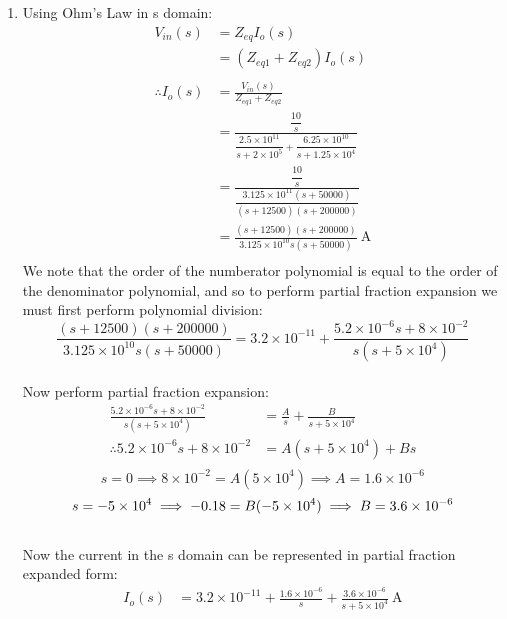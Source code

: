 \begin{enumerate}
	\item{
		Using Ohm's Law in s domain:
		\begin{align*}
			V_{in}(s) &= Z_{eq} I_o(s) \\
			&= (Z_{eq1} + Z_{eq2}) I_o(s) \\
			\\
			\therefore I_o(s) &= \frac{V_{in}(s)}{Z_{eq1} + Z_{eq2}} \\
			&= \frac{\dfrac{10}{s}} 
			{\dfrac{2.5 \times 10^{11}}
			{s + 2 \times 10^5} + \dfrac{6.25 \times 10^{10}}{s + 1.25 \times 10^4}} \\
			&= \frac{\dfrac{10}{s}} 
			{\dfrac{3.125 \times 10^{11} (s + 50000)}{(s+12500)(s+200000)}} \\
			&= \frac{(s+12500)(s+200000)}{3.125 \times 10^{10} s (s + 50000)} \ \mathrm{A} \\
		\end{align*}
		We note that the order of the numberator polynomial is equal to the order of the denominator polynomial, and so to perform partial fraction expansion we must first perform polynomial division:
		\\
		\begin{equation*}
			\frac{(s+12500)(s+200000)}{3.125 \times 10^{10} s (s + 50000)} = 3.2\times10^{-11} + \frac{5.2\times10^{-6}s + 8\times10^{-2}}{s(s+5\times10^4)}
		\end{equation*}
		\\
		Now perform partial fraction expansion:
		\begin{align*}
			\frac{5.2\times10^{-6}s + 8\times10^{-2}}{s(s+5\times10^4)} &= \frac{A}{s} + \frac{B}{s+5\times10^4} \\
			\therefore 5.2\times10^{-6}s + 8\times10^{-2} &= A(s+5\times10^4) + Bs \\
		\end{align*}
		\begin{equation*}
			s = 0 \implies 8\times10^{-2} = A(5\times10^4) \implies A = 1.6\times10^{-6}
		\end{equation*}
		\begin{equation*}
			s = -5\times10^4 \implies -0.18 = B(-5\times10^4) \implies B = 3.6\times10^{-6} \\
		\end{equation*}
		\\
		Now the current in the s domain can be represented in partial fraction expanded form:
		\begin{align*}
			I_o(s) &= 3.2\times10^{-11} + \frac{1.6\times10^{-6}}{s} + \frac{3.6\times10^{-6}}{s+5\times10^4} \ \mathrm{A} \\

\end{align*}}
\end{enumerate}
